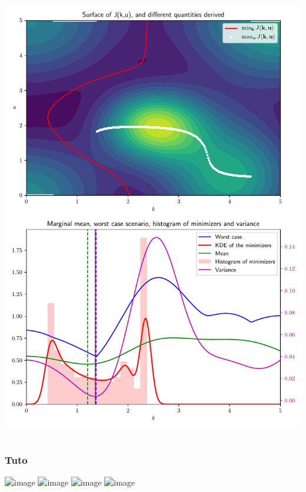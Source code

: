 \documentclass[11pt]{beamer}
\newcommand{\Prob}{\mathbb{P}}
\begin{document}
{\begin{columns}
\begin{column}{0.5\textwidth}
\begin{center}
                      \includegraphics[scale=0.3]{summary_criteria}
                    \end{center}
                  \end{column}
                \end{columns}
              }
\begin{frame}
  \frametitle{Tuto}
  \begin{center}
  \includegraphics<1>[scale=0.5]{relaxation_tuto_1}
  \includegraphics<2>[scale=0.5]{relaxation_tuto_2}
  \includegraphics<3>[scale=0.5]{relaxation_tuto_3}
  \includegraphics<4>[scale=0.5]{relaxation_tuto_4}
\end{center}
\end{frame}
\end{document}
